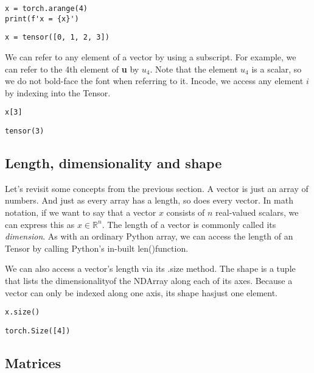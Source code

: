 \documentclass[]{article}
\begin{document}
\begin{verbatim}
x = torch.arange(4)
print(f'x = {x}')
\end{verbatim}

\begin{verbatim}
x = tensor([0, 1, 2, 3])
\end{verbatim}

We can refer to any element of a vector by using a subscript. For example, we can refer to the 4th element of \textbf{u} by $ u_4 $. Note that the element $ u_4 $ is a scalar, so we do not bold-face the font when referring to it. Incode, we access any element $ i $ by indexing into the Tensor.

\begin{verbatim}
x[3]
\end{verbatim}

\begin{verbatim}
tensor(3)
\end{verbatim}

\subsection{Length, dimensionality and shape}

Let’s revisit some concepts from the previous section. A vector is just an array of numbers. And just as every array has a length, so does every vector. In math notation, if we want to say that a vector $ x $ consists of $ n $ real-valued scalars, we can express this as $ x \in \mathbb{R}^n $.  The length of a vector is commonly called its \textit{dimension}. As with an ordinary Python array, we can access the length of an Tensor by calling Python’s in-built len()function.

We can also access a vector’s length via its .size method. The shape is a tuple that lists the dimensionalityof the NDArray along each of its axes. Because a vector can only be indexed along one axis, its shape hasjust one element.

\begin{verbatim}
x.size()
\end{verbatim}

\begin{verbatim}
torch.Size([4])
\end{verbatim}

\subsection{Matrices}
\end{document}
